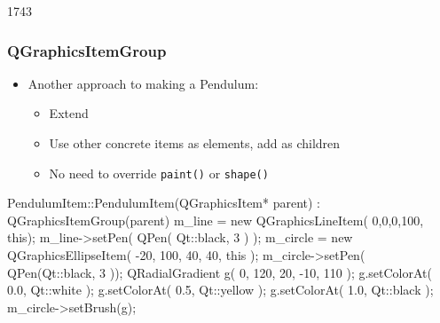 \begin{slide}[fragile]{1743}
\frametitle{QGraphicsItemGroup}
\begin{itemize}
\item Another approach to making a Pendulum:
    \begin{itemize}
    \item Extend 

    \item Use other concrete items as elements, add as children
    \item No need to override \texttt{paint()} or \texttt{shape()}
    \end{itemize} 
\end{itemize}
\begin{cpp}
PendulumItem::PendulumItem(QGraphicsItem* parent)
  : QGraphicsItemGroup(parent) { 
  m_line = new QGraphicsLineItem( 0,0,0,100, this);
  m_line->setPen( QPen( Qt::black, 3 ) );
  m_circle = new QGraphicsEllipseItem( -20, 100, 40, 40, this );
  m_circle->setPen( QPen(Qt::black, 3 ));
  QRadialGradient g( 0, 120, 20, -10, 110 );
  g.setColorAt( 0.0, Qt::white );
  g.setColorAt( 0.5, Qt::yellow );
  g.setColorAt( 1.0, Qt::black );
  m_circle->setBrush(g);  
}
\end{cpp}
\end{slide}



